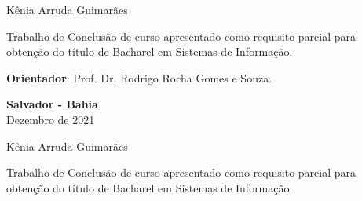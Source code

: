 \documentclass[12pt, a4paper]{report}
\begin{document}
\newpage
\begin{center}

\vspace{4cm}

\large{Kênia Arruda Guimarães}
\end{center}

\vspace{4cm}

\begin{flushright}
\begin{minipage}{8.6cm}
Trabalho de Conclusão de curso apresentado como requisito parcial para obtenção do título de Bacharel em Sistemas de Informação.

\vspace{0.5cm}
\textbf{Orientador}: Prof. Dr. Rodrigo Rocha Gomes e Souza.

\end{minipage}
\end{flushright}
 
\vspace{6.95cm}

\begin{center}
\textbf{Salvador - Bahia} \\
Dezembro de 2021
\end{center}
\thispagestyle{empty} 



\newpage
\begin{center}
\vspace{1.3 cm}
\par{}

\vspace{2cm}

\large{Kênia Arruda Guimarães}
\end{center}

\vspace{1.3 cm}

\begin{flushright}
\begin{minipage}{8.6cm} 
Trabalho de Conclusão de curso apresentado como requisito parcial para obtenção do título de Bacharel em Sistemas de Informação.
\end{minipage}
\end{flushright}
 
\end{document}
